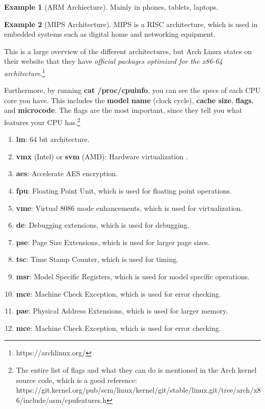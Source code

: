\documentclass{article}
\theoremstyle{definition}
\newtheorem{example}{Example}[section]
\begin{document}
    \begin{example}[ARM Archiecture]
      Mainly in phones, tablets, laptops. 
    \end{example}

    \begin{example}[MIPS Architecture]
      MIPS is a RISC architecture, which is used in embedded systems such as digital home and networking equipment. 
    \end{example}

    This is a large overview of the different architectures, but Arch Linux states on their website that they have \textit{official packages optimized for the x86-64 architecture}.\footnote{https://archlinux.org/} 

    Furthermore, by running \textbf{cat /proc/cpuinfo}, you can see the specs of each CPU core you have. This includes the \textbf{model name} (clock cycle), \textbf{cache size}, \textbf{flags}, and \textbf{microcode}. The flags are the most important, since they tell you what features your CPU has.\footnote{The entire list of flags and what they can do is mentioned in the Arch kernel source code, which is a good reference: https://git.kernel.org/pub/scm/linux/kernel/git/stable/linux.git/tree/arch/x86/include/asm/cpufeatures.h} 
    \begin{enumerate} 
      \item \textbf{lm}: 64 bit architecture. 
      \item \textbf{vmx} (Intel) or \textbf{svm} (AMD): Hardware virtualization . 
      \item \textbf{aes}: Accelerate AES encryption. 
      \item \textbf{fpu}: Floating Point Unit, which is used for floating point operations. 
      \item \textbf{vme}: Virtual 8086 mode enhancements, which is used for virtualization. 
      \item \textbf{de}: Debugging extensions, which is used for debugging. 
      \item \textbf{pse}: Page Size Extensions, which is used for larger page sizes. 
      \item \textbf{tsc}: Time Stamp Counter, which is used for timing. 
      \item \textbf{msr}: Model Specific Registers, which is used for model specific operations. 
      \item \textbf{mce}: Machine Check Exception, which is used for error checking. 
      \item \textbf{pae}: Physical Address Extensions, which is used for larger memory. 
      \item \textbf{mce}: Machine Check Exception, which is used for error checking. 

    \end{enumerate}
\end{document}

